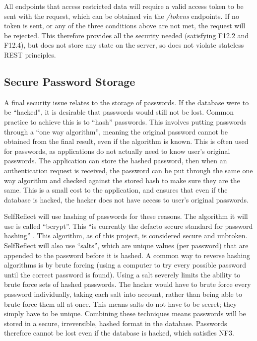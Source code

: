 \documentclass[11pt,openright,a4paper]{report}
\begin{document}
All endpoints that access restricted data will require a valid access token to be sent with the request, which can be obtained via the \emph{/tokens} endpoints. If no token is sent, or any of the three conditions above are not met, the request will be rejected. This therefore provides all the security needed (satisfying F12.2 and F12.4), but does not store any state on the server, so does not violate stateless REST principles.

\subsection{Secure Password Storage} \label{subsec:secpass}
A final security issue relates to the storage of passwords. If the database were to be \enquote{hacked}, it is desirable that passwords would still not be lost. Common practice to achieve this is to \enquote{hash} passwords. This involves putting passwords through a \enquote{one way algorithm}, meaning the original password cannot be obtained from the final result, even if the algorithm is known. This is often used for passwords, as applications do not actually need to know user's original passwords. The application can store the hashed password, then when an authentication request is received, the password can be put through the same one way algorithm and checked against the stored hash to make sure they are the same. This is a small cost to the application, and ensures that even if the database is hacked, the hacker does not have access to user's original passwords.

SelfReflect will use hashing of passwords for these reasons. The algorithm it will use is called \enquote{bcrypt}. This \enquote{is currently the defacto secure standard for password hashing} \parencite{bcryptblog}. This algorithm, as of this project, is considered secure and unbroken. SelfReflect will also use \enquote{salts}, which are unique values (per password) that are appended to the password before it is hashed. A common way to reverse hashing algorithms is by brute forcing (using a computer to try every possible password until the correct password is found). Using a salt severely limits the ability to brute force sets of hashed passwords. The hacker would have to brute force every password individually, taking each salt into account, rather than being able to brute force them all at once. This means salts do not have to be secret; they simply have to be unique. Combining these techniques means passwords will be stored in a secure, irreversible, hashed format in the database. Passwords therefore cannot be lost even if the database is hacked, which satisfies NF3.
\end{document}
